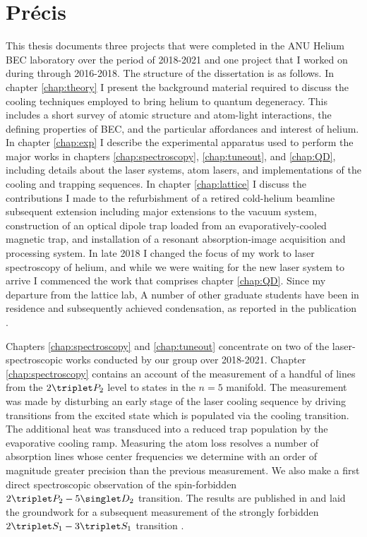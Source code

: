 	


\section*{Pr\'{e}cis}\label{sec:abstract}


	This thesis documents three projects that were completed in the ANU
	Helium BEC laboratory over the period of 2018-2021 and one project that I worked on during through 2016-2018. The structure of the dissertation is as follows.
	In chapter \ref{chap:theory} I present the background material required to discuss the cooling techniques employed to bring helium to quantum degeneracy. This includes a short survey of atomic structure and atom-light interactions, the defining properties of BEC, and the particular affordances and interest of helium.
	In chapter \ref{chap:exp} I describe the experimental apparatus used to perform the major works in chapters \ref{chap:spectroscopy}, \ref{chap:tuneout}, and \ref{chap:QD}, including details about the laser systems, atom lasers, and implementations of the cooling and trapping sequences.
	In chapter \ref{chap:lattice} I discuss the contributions I made to the refurbishment of a retired cold-helium beamline subsequent extension including major extensions to the vacuum system, construction of  an optical dipole trap loaded from an evaporatively-cooled magnetic trap, and installation of a resonant absorption-image acquisition and processing system. In late 2018 I changed the focus of my work to laser spectroscopy of helium, and while we were waiting for the new laser system to arrive I commenced the work that comprises chapter \ref{chap:QD}. Since my departure from the lattice lab, A number of	other graduate students have been in residence and subsequently achieved condensation, as reported in the publication \cite{Abbas21}.
	 
	Chapters \ref{chap:spectroscopy} and \ref{chap:tuneout} concentrate on two of the laser-spectroscopic works conducted by our group over 2018-2021.
	Chapter \ref{chap:spectroscopy} contains an account of the measurement of a handful of lines from the $2\triplet P_2$ level to states in the $n=5$ manifold. The measurement was made by disturbing an early stage of the laser cooling sequence by driving transitions from the excited state which is populated via the cooling transition. The additional heat was transduced into a reduced trap population by the evaporative cooling ramp. Measuring the atom loss resolves a number of absorption lines whose center frequencies we determine with an order of magnitude greater precision than the previous measurement. We also make a first direct spectroscopic observation of the spin-forbidden $2\triplet P_2 - 5\singlet D_2$ transition. The results are published in \cite{Ross20} and laid the groundwork for a subsequent measurement of the strongly forbidden $2\triplet S_1 - 3 \triplet S_1$ transition \cite{Thomas20}.
	
